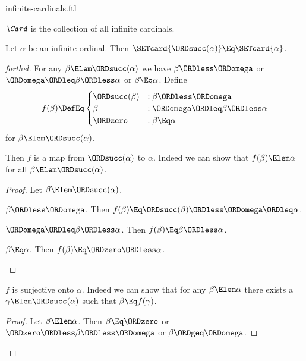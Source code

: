 \documentclass{stex}
\begin{document}
\begin{smodule}{infinite-cardinals.ftl}

\begin{definition}[forthel,for=Card]
  $\emph{\Card}$ is the collection of all infinite cardinals.
\end{definition}

\begin{proposition}[forthel]
  Let $\alpha$ be an infinite ordinal.
  Then $\SETcard{\ORDsucc(\alpha)} \Eq \SETcard{\alpha}$.
\end{proposition}
\begin{proof}[forthel]
  For any $\beta \Elem \ORDsucc(\alpha)$ we have
  $\beta \ORDless \ORDomega$ or $\ORDomega \ORDleq \beta \ORDless \alpha$ or $\beta \Eq \alpha$.
  Define \[ f(\beta) \DefEq
    \begin{cases}
      \ORDsucc(\beta) & : \beta \ORDless \ORDomega
      \\
      \beta           & : \ORDomega \ORDleq \beta \ORDless \alpha
      \\
      \ORDzero        & : \beta \Eq \alpha
    \end{cases} \]
  for $\beta \Elem \ORDsucc(\alpha)$.

  Then $f$ is a map from $\ORDsucc(\alpha)$ to $\alpha$.
  Indeed we can show that $f(\beta) \Elem \alpha$ for all
  $\beta \Elem \ORDsucc(\alpha)$.
  \begin{proof}
    Let $\beta \Elem \ORDsucc(\alpha)$.

    \begin{case}{$\beta \ORDless \ORDomega$.}
      Then $f(\beta)
        \Eq \ORDsucc(\beta)
        \ORDless \ORDomega
        \ORDleq \alpha$.
    \end{case}

    \begin{case}{$\ORDomega \ORDleq \beta \ORDless \alpha$.}
      Then $f(\beta)
        \Eq \beta
        \ORDless \alpha$.
    \end{case}

    \begin{case}{$\beta \Eq \alpha$.}
      Then $f(\beta)
        \Eq \ORDzero
        \ORDless \alpha$.
    \end{case}
  \end{proof}

  $f$ is surjective onto $\alpha$.
  Indeed we can show that for any $\beta \Elem \alpha$ there exists a
  $\gamma \Elem \ORDsucc(\alpha)$ such that $\beta \Eq f(\gamma)$.
  \begin{proof}
    Let $\beta \Elem \alpha$.
    Then $\beta \Eq \ORDzero$ or $\ORDzero \ORDless \beta \ORDless \ORDomega$ or $\beta \ORDgeq \ORDomega$.


\end{proof}
\end{proof}
\end{smodule}
\end{document}
